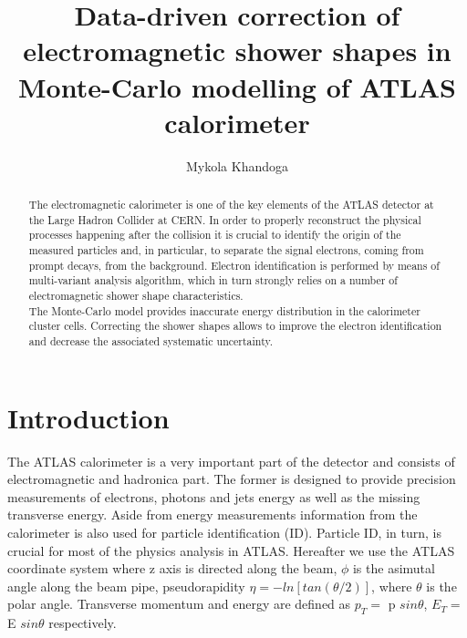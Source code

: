 
\title{Data-driven correction of electromagnetic shower shapes in Monte-Carlo modelling of ATLAS calorimeter}


\author{Mykola Khandoga}

\maketitle
\begin{abstract}
The electromagnetic calorimeter is one of the key elements of the ATLAS detector at the Large Hadron Collider at CERN. 
In order to properly reconstruct the physical processes happening after the collision it is crucial to identify the origin of the measured particles and, in particular, to separate the signal electrons, coming from prompt decays, from the background. 
Electron identification is performed by means of multi-variant analysis algorithm, which in turn strongly relies on a number of electromagnetic shower shape characteristics. \\
The Monte-Carlo model provides inaccurate energy distribution in the calorimeter cluster cells.
Correcting the shower shapes allows to improve the electron identification and decrease the associated systematic uncertainty.
\end{abstract}

\section{Introduction}

The ATLAS calorimeter is a very important part of the detector and consists of electromagnetic and hadronica part. The former is designed to provide precision measurements of electrons, photons and jets energy as well as the missing transverse energy. Aside from energy measurements information from the calorimeter is also used for particle identification (ID). Particle ID, in turn, is crucial for most of the physics analysis in ATLAS. Hereafter we use the ATLAS coordinate system where z axis is directed along the beam, $\phi$ is the asimutal angle along the beam pipe, pseudorapidity $\eta =  −ln[tan (\theta/2)]$, where $\theta$ is the polar angle.  Transverse momentum and energy are defined as $p_T =$ p $sin\theta$, $E_T =$E $sin\theta$ respectively.

